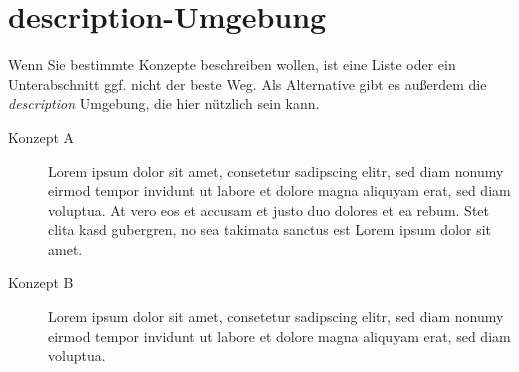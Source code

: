 

\section{description-Umgebung} %
\label{sec:description_umgebung}
Wenn Sie bestimmte Konzepte beschreiben wollen, ist eine Liste oder ein Unterabschnitt ggf. nicht der beste Weg. Als Alternative gibt es außerdem die \emph{description} Umgebung, die hier nützlich sein kann.

\begin{description}
	\item[Konzept A] Lorem ipsum dolor sit amet, consetetur sadipscing elitr, sed diam nonumy eirmod tempor invidunt ut labore et dolore magna aliquyam erat, sed diam voluptua. At vero eos et accusam et justo duo dolores et ea rebum. Stet clita kasd gubergren, no sea takimata sanctus est Lorem ipsum dolor sit amet.
	\item[Konzept B] Lorem ipsum dolor sit amet, consetetur sadipscing elitr, sed diam nonumy eirmod tempor invidunt ut labore et dolore magna aliquyam erat, sed diam voluptua.
\end{description}



